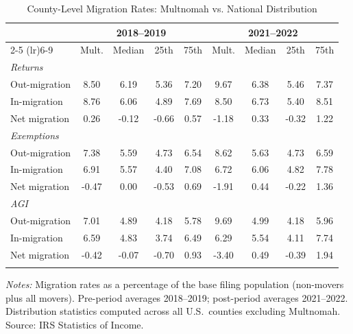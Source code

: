 \begin{table}[htbp]
\centering
\caption{County-Level Migration Rates: Multnomah vs. National Distribution}
\label{tab:migration_county}
\begin{threeparttable}
\small
\begin{tabular}{lcccccccc}
\toprule
 & \multicolumn{4}{c}{2018--2019} & \multicolumn{4}{c}{2021--2022} \\
\cmidrule(lr){2-5} \cmidrule(lr){6-9}
 & Mult. & Median & 25th & 75th & Mult. & Median & 25th & 75th \\
\midrule
\textit{Returns} & & & & & & & & \\
\quad Out-migration &  8.50 &  6.19 &  5.36 &  7.20 &  9.67 &  6.38 &  5.46 &  7.37 \\
\quad In-migration &  8.76 &  6.06 &  4.89 &  7.69 &  8.50 &  6.73 &  5.40 &  8.51 \\
\quad Net migration &  0.26 & -0.12 & -0.66 &  0.57 & -1.18 &  0.33 & -0.32 &  1.22 \\
\addlinespace
\textit{Exemptions} & & & & & & & & \\
\quad Out-migration &  7.38 &  5.59 &  4.73 &  6.54 &  8.62 &  5.63 &  4.73 &  6.59 \\
\quad In-migration &  6.91 &  5.57 &  4.40 &  7.08 &  6.72 &  6.06 &  4.82 &  7.78 \\
\quad Net migration & -0.47 &  0.00 & -0.53 &  0.69 & -1.91 &  0.44 & -0.22 &  1.36 \\
\addlinespace
\textit{AGI} & & & & & & & & \\
\quad Out-migration &  7.01 &  4.89 &  4.18 &  5.78 &  9.69 &  4.99 &  4.18 &  5.96 \\
\quad In-migration &  6.59 &  4.83 &  3.74 &  6.49 &  6.29 &  5.54 &  4.11 &  7.74 \\
\quad Net migration & -0.42 & -0.07 & -0.70 &  0.93 & -3.40 &  0.49 & -0.39 &  1.94 \\
\addlinespace
\bottomrule
\end{tabular}
\begin{tablenotes}[flushleft]
\small
\item \textit{Notes:} Migration rates as a percentage of the base filing population (non-movers plus all movers). Pre-period averages 2018--2019; post-period averages 2021--2022. Distribution statistics computed across all U.S.\ counties excluding Multnomah. Source: IRS Statistics of Income.
\end{tablenotes}
\end{threeparttable}
\end{table}
